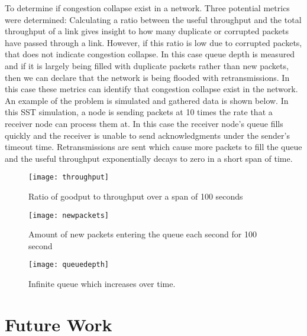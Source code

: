 \documentclass{article}
\begin{document}
To determine if congestion collapse exist in a network. Three potential metrics were determined:\newline
\indent Calculating a ratio between the useful throughput and the total throughput of a link gives insight to how many duplicate or corrupted packets have passed through a link. However, if this ratio is low due to corrupted packets, that does not indicate congestion collapse. In this case queue depth is measured and if it is largely being filled with duplicate packets rather than new packets, then we can declare that the network is being flooded with retransmissions. In this case these metrics can identify that congestion collapse exist in the network.\newline
\indent An example of the problem is simulated and gathered data is shown below. In this SST simulation, a node is sending packets at 10 times the rate that a receiver node can process them at. In this case the receiver node's queue fills quickly and the receiver is unable to send acknowledgments under the sender's timeout time. Retransmissions are sent which cause more packets to fill the queue and the useful throughput exponentially decays to zero in a short span of time. \newline\newline

\begin{figure}[H]
\texttt{[image: throughput]}
\centering
\caption{Ratio of goodput to throughput over a span of 100 seconds}
\end{figure}

\begin{figure}[H]
	\texttt{[image: newpackets]}
	\centering
	\caption{Amount of new packets entering the queue each second for 100 second}
\end{figure}

\begin{figure}[H]
	\texttt{[image: queuedepth]}
	\centering
	\caption{Infinite queue which increases over time.}
\end{figure}

\section{Future Work}
\end{document}
